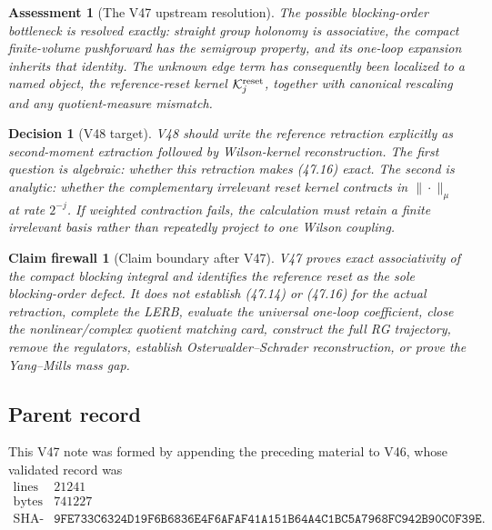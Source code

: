 \documentclass[11pt,oneside]{book}
\newtheorem{assessment}[theorem]{Assessment}
\newtheorem{firewall}[theorem]{Claim firewall}
\newtheorem{decision}[theorem]{Decision}
\theoremstyle{definition}
\theoremstyle{remark}
\begin{document}
\begin{assessment}[The V47 upstream resolution]
\label{ass:e8v47-status}
The possible blocking-order bottleneck is resolved exactly:
straight group holonomy is associative, the compact finite-volume
pushforward has the semigroup property, and its one-loop expansion
inherits that identity.  The unknown edge term has consequently
been localized to a named object, the reference-reset kernel
\({\cal K}^{\rm reset}_j\), together with canonical rescaling and
any quotient-measure mismatch.
\end{assessment}

\begin{decision}[V48 target]
\label{dec:e8v47-next}
V48 should write the reference retraction explicitly as
second-moment extraction followed by Wilson-kernel reconstruction.
The first question is algebraic: whether this retraction makes
(47.16) exact.  The second is analytic: whether the complementary
irrelevant reset kernel contracts in \(\|\cdot\|_\mu\) at rate
\(2^{-j}\).  If weighted contraction fails, the calculation must
retain a finite irrelevant basis rather than repeatedly project to
one Wilson coupling.
\end{decision}

\begin{firewall}[Claim boundary after V47]
\label{fire:e8v47-claim}
V47 proves exact associativity of the compact blocking integral and
identifies the reference reset as the sole blocking-order defect.
It does not establish (47.14) or (47.16) for the actual retraction,
complete the LERB, evaluate the universal one-loop coefficient,
close the nonlinear/complex quotient matching card, construct the
full RG trajectory, remove the regulators, establish
Osterwalder--Schrader reconstruction, or prove the Yang--Mills mass
gap.
\end{firewall}

\subsection{Parent record}

This V47 note was formed by appending the preceding material to V46,
whose validated record was
\[
\begin{array}{c|c}
\text{lines}&21241\\
\text{bytes}&741227\\
\text{SHA-256}&
\texttt{9FE733C6324D19F6B6836E4F6AFAF41A151B64A4C1BC5A7968FC942B90C0F39E}.
\end{array}
\]
\end{document}
